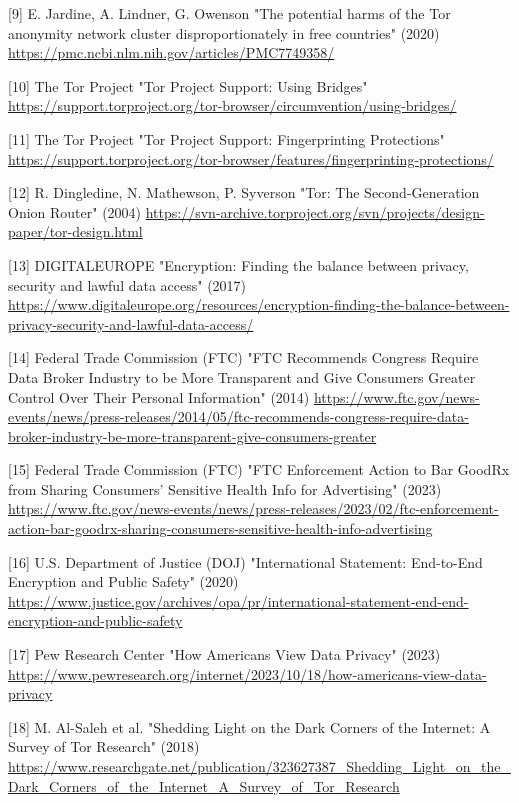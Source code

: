 \documentclass[
]{article}
\begin{document}
{[}9{]} E. Jardine, A. Lindner, G. Owenson "The potential harms of the
Tor anonymity network cluster disproportionately in free countries"
(2020) \url{https://pmc.ncbi.nlm.nih.gov/articles/PMC7749358/}

{[}10{]} The Tor Project "Tor Project Support: Using Bridges"
\url{https://support.torproject.org/tor-browser/circumvention/using-bridges/}

{[}11{]} The Tor Project "Tor Project Support: Fingerprinting
Protections"
\url{https://support.torproject.org/tor-browser/features/fingerprinting-protections/}

{[}12{]} R. Dingledine, N. Mathewson, P. Syverson "Tor: The
Second-Generation Onion Router" (2004)
\url{https://svn-archive.torproject.org/svn/projects/design-paper/tor-design.html}

{[}13{]} DIGITALEUROPE "Encryption: Finding the balance between privacy,
security and lawful data access" (2017)
\url{https://www.digitaleurope.org/resources/encryption-finding-the-balance-between-privacy-security-and-lawful-data-access/}

{[}14{]} Federal Trade Commission (FTC) "FTC Recommends Congress Require
Data Broker Industry to be More Transparent and Give Consumers Greater
Control Over Their Personal Information" (2014)
\url{https://www.ftc.gov/news-events/news/press-releases/2014/05/ftc-recommends-congress-require-data-broker-industry-be-more-transparent-give-consumers-greater}

{[}15{]} Federal Trade Commission (FTC) "FTC Enforcement Action to Bar
GoodRx from Sharing Consumers' Sensitive Health Info for Advertising"
(2023)
\url{https://www.ftc.gov/news-events/news/press-releases/2023/02/ftc-enforcement-action-bar-goodrx-sharing-consumers-sensitive-health-info-advertising}

{[}16{]} U.S. Department of Justice (DOJ) "International Statement:
End-to-End Encryption and Public Safety" (2020)
\url{https://www.justice.gov/archives/opa/pr/international-statement-end-end-encryption-and-public-safety}

{[}17{]} Pew Research Center "How Americans View Data Privacy" (2023)
\url{https://www.pewresearch.org/internet/2023/10/18/how-americans-view-data-privacy}

{[}18{]} M. Al-Saleh et al. "Shedding Light on the Dark Corners of the
Internet: A Survey of Tor Research" (2018)
\url{https://www.researchgate.net/publication/323627387_Shedding_Light_on_the_Dark_Corners_of_the_Internet_A_Survey_of_Tor_Research}
\end{document}
